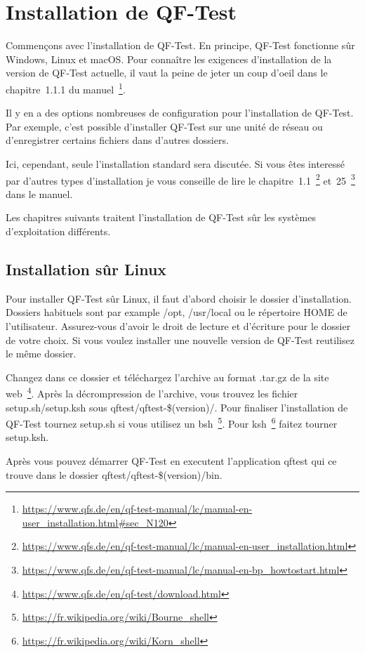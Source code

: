 \documentclass{article}
\begin{document}
\section{Installation de QF-Test}
\par{
Commençons avec l'installation de QF-Test. En principe, QF-Test fonctionne sûr Windows, Linux et macOS.
Pour connaître les exigences d'installation de la version de QF-Test actuelle, il vaut la peine de jeter un
coup d'oeil dans le chapitre~1.1.1 du
manuel~\footnote{\url{https://www.qfs.de/en/qf-test-manual/lc/manual-en-user\_installation.html\#sec_N120}}.
}
\par{
Il y en a des options nombreuses de configuration pour l'installation de QF-Test. Par exemple, c'est
possible d'installer QF-Test sur une unité de réseau ou d'enregistrer certains fichiers dans d'autres
dossiers.
}
\par{
Ici, cependant, seule l'installation standard sera discutée. Si vous êtes interessé par d'autres types
d'installation je vous conseille de lire le
chapitre~1.1~\footnote{\url{https://www.qfs.de/en/qf-test-manual/lc/manual-en-user_installation.html}}
et~25~\footnote{\url{https://www.qfs.de/en/qf-test-manual/lc/manual-en-bp_howtostart.html}} dans le manuel.
\par{
Les chapitres suivants traitent l'installation de QF-Test sûr les systèmes d'exploitation différents.
}

\subsection{Installation sûr Linux}
\par{
Pour installer QF-Test sûr Linux, il faut d'abord choisir le dossier d'installation. Dossiers habituels
sont par example /opt, /usr/local ou le répertoire HOME de l'utilisateur. Assurez-vous d'avoir le droit de
lecture et d'écriture pour le dossier de votre choix. Si vous voulez installer une nouvelle version de
QF-Test reutilisez le même dossier.
}
\par{
Changez dans ce dossier et téléchargez l'archive au format .tar.gz de la
site web~\footnote{\url{https://www.qfs.de/en/qf-test/download.html}}. Après la décrompression de
l'archive, vous trouvez les fichier setup.sh/setup.ksh sous qftest/qftest-\$(version)/. Pour finaliser
l'installation de QF-Test tournez setup.sh si vous utilisez un
bsh~\footnote{\url{https://fr.wikipedia.org/wiki/Bourne_shell}}. Pour
ksh~\footnote{\url{https://fr.wikipedia.org/wiki/Korn_shell}} faitez tourner setup.ksh.
}
\par{
Après vous pouvez démarrer QF-Test en executent l'application qftest qui ce trouve dans le dossier
qftest/qftest-\$(version)/bin.
}

}
\end{document}
